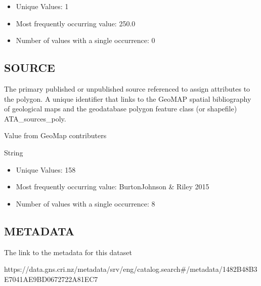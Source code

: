 \documentclass[letterpaper,10pt,english]{sphinxmanual}
\begin{document}

\begin{itemize}
\item {} 
Unique Values: 1

\item {} 
Most frequently occurring value: 250.0

\item {} 
Number of values with a single occurrence: 0

\end{itemize}


\subsection{SOURCE}
\label{\detokenize{field_glossary:source}}
The primary published or unpublished source referenced to assign attributes to the polygon.  A unique identifier that links to the GeoMAP spatial bibliography of geological maps and the geodatabase polygon feature class (or shapefile) ATA\_sources\_poly.

Value from GeoMap contributers

String


\begin{itemize}
\item {} 
Unique Values: 158

\item {} 
Most frequently occurring value: Burton\sphinxhyphen{}Johnson \& Riley 2015

\item {} 
Number of values with a single occurrence: 8

\end{itemize}


\subsection{METADATA}
\label{\detokenize{field_glossary:metadata}}
The link to the metadata for this dataset

https://data.gns.cri.nz/metadata/srv/eng/catalog.search\#/metadata/1482B48B\sphinxhyphen{}3E70\sphinxhyphen{}41AE\sphinxhyphen{}9BD0\sphinxhyphen{}672722A81EC7
\end{document}
